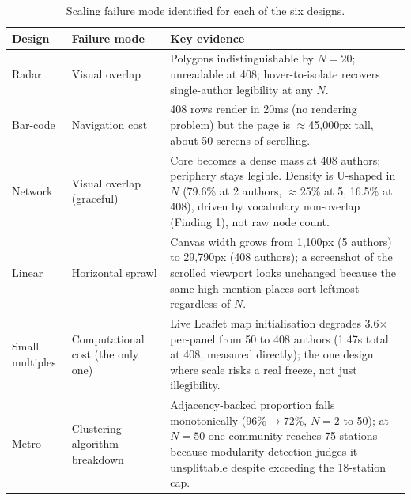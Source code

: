 \documentclass[logo,msc]{infthesis}
\begin{document}
\begin{table}[h]
\centering
\caption{Scaling failure mode identified for each of the six designs.}
\label{tab:scale-summary}
\small
\begin{tabular}{lp{3.2cm}p{6.8cm}}
\toprule
Design & Failure mode & Key evidence \\
\midrule
Radar & Visual overlap & Polygons indistinguishable by $N{=}20$; unreadable at 408; hover-to-isolate recovers single-author legibility at any $N$. \\
Bar-code & Navigation cost & 408 rows render in 20ms (no rendering problem) but the page is $\approx$45,000px tall, about 50 screens of scrolling. \\
Network & Visual overlap (graceful) & Core becomes a dense mass at 408 authors; periphery stays legible. Density is U-shaped in $N$ (79.6\% at 2 authors, $\approx$25\% at 5, 16.5\% at 408), driven by vocabulary non-overlap (Finding 1), not raw node count. \\
Linear & Horizontal sprawl & Canvas width grows from 1{,}100px (5 authors) to 29{,}790px (408 authors); a screenshot of the scrolled viewport looks unchanged because the same high-mention places sort leftmost regardless of $N$. \\
Small multiples & Computational cost (the only one) & Live Leaflet map initialisation degrades 3.6$\times$ per-panel from 50 to 408 authors (1.47s total at 408, measured directly); the one design where scale risks a real freeze, not just illegibility. \\
Metro & Clustering algorithm breakdown & Adjacency-backed proportion falls monotonically (96\%$\to$72\%, $N{=}2$ to 50); at $N{=}50$ one community reaches 75 stations because modularity detection judges it unsplittable despite exceeding the 18-station cap. \\
\bottomrule
\end{tabular}
\end{table}
\end{document}
